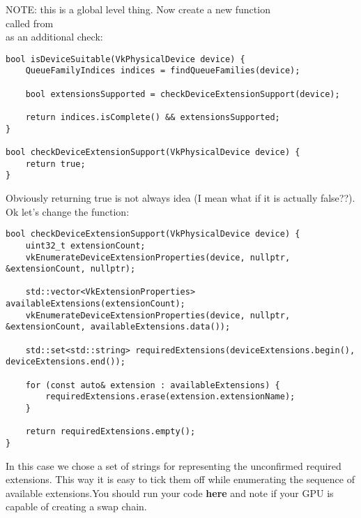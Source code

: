 \par NOTE: this is a global level thing. Now create a new function \\  called from \\  as an additional check:

\begin{center}
\begin{minipage}{0.95\linewidth}
\begin{lstlisting}
bool isDeviceSuitable(VkPhysicalDevice device) {
    QueueFamilyIndices indices = findQueueFamilies(device);

    bool extensionsSupported = checkDeviceExtensionSupport(device);

    return indices.isComplete() && extensionsSupported;
}

bool checkDeviceExtensionSupport(VkPhysicalDevice device) {
    return true;
}
\end{lstlisting}
\end{minipage}
\end{center}

\par Obviously returning true is not always idea (I mean what if it is actually false??). Ok let's change the function:

\begin{center}
\begin{minipage}{0.95\linewidth}
\begin{lstlisting}
bool checkDeviceExtensionSupport(VkPhysicalDevice device) {
    uint32_t extensionCount;
    vkEnumerateDeviceExtensionProperties(device, nullptr, &extensionCount, nullptr);

    std::vector<VkExtensionProperties> availableExtensions(extensionCount);
    vkEnumerateDeviceExtensionProperties(device, nullptr, &extensionCount, availableExtensions.data());

    std::set<std::string> requiredExtensions(deviceExtensions.begin(), deviceExtensions.end());

    for (const auto& extension : availableExtensions) {
        requiredExtensions.erase(extension.extensionName);
    }

    return requiredExtensions.empty();
}
\end{lstlisting}
\end{minipage}
\end{center}

\par In this case we chose a set of strings for representing the unconfirmed required extensions. This way it is easy to tick them off while enumerating the sequence of available extensions.You should run your code \textbf{here} and note if your GPU is capable of creating a swap chain.

